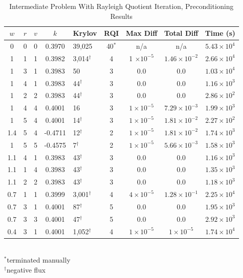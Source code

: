 \begin{table}[!h]
\caption{Intermediate Problem With Rayleigh Quotient Iteration, Preconditioning Results}
\begin{center}
\begin{tabular}{c c c c l c c c c}
\hline
$w$ & $r$ & $v$ & $k$ & Krylov & RQI & Max Diff & Total Diff & Time (s) \\[0.5ex]
\hline
0    & 0 & 0 & 0.3970 & 39,025              & 40$^{*}$  & n/a & n/a & $5.43 \times 10^{4}$ \\
1    & 1 & 1 & 0.3982 & 3,014$^{\dag}$ & 4 & 1 $\times 10^{-5}$ & $1.46 \times 10^{-2}$ & $2.66 \times 10^{4}$ \\
1    & 3 & 1 & 0.3983 & 50                     & 3 & 0.0 & 0.0 & $1.03 \times 10^{4}$ \\
1    & 4 & 1 & 0.3983 & 44$^{\dag}$      & 3 & 0.0 & 0.0 & $1.16 \times 10^{3}$ \\
1    & 2 & 2 & 0.3983 & 44$^{\dag}$      & 3 & 0.0 & 0.0 & $2.86 \times 10^{2}$ \\
1    & 4 & 4 & 0.4001 & 16                     & 3 & $1 \times 10^{-5}$ & $7.29 \times 10^{-3}$ & $1.99 \times 10^{3}$ \\
1    & 5 & 4 & 0.4001 & 14$^{\dag}$     & 3 & $1 \times 10^{-5}$ & $1.81 \times 10^{-2}$ & $2.27 \times 10^{2}$ \\
1.4 & 5 & 4 & -0.4711 & 12$^{\dag}$    & 2 & $1 \times 10^{-5}$ & $1.81 \times 10^{-2}$ & $1.74 \times 10^{3}$ \\
1    & 5 & 5 & -0.4575 & 7$^{\dag}$      & 2 & $1 \times 10^{-5}$ & $5.66 \times 10^{-3}$ & $1.58 \times 10^{3}$ \\
\hline
1.1 & 4 & 1 & 0.3983 & 43$^{\dag}$      & 3 & 0.0 & 0.0 & $1.16 \times 10^{3}$ \\
1.1 & 1 & 4 & 0.3983 & 43$^{\dag}$      & 3 & 0.0 & 0.0 & $1.35 \times 10^{3}$ \\
1.1 & 2 & 2 & 0.3983 & 43$^{\dag}$      & 3 & 0.0 & 0.0 & $1.18 \times 10^{3}$ \\
\hline
0.7 & 1 & 1 & 0.3999 & 3,001$^{\dag}$ & 4 & $4 \times 10^{-5}$ & $1.28 \times 10^{-1}$ & $2.25 \times 10^{4}$ \\
0.7 & 3 & 1 & 0.4001 & 87$^{\dag}$      & 5 & 0.0 & 0.0 & $1.95 \times 10^{3}$ \\
0.7 & 3 & 3 & 0.4001 & 47$^{\dag}$      & 5 & 0.0 & 0.0 & $2.92 \times 10^{3}$ \\
0.4 & 3 & 1 & 0.4001 & 1,052$^{\dag}$ & 4 & $1 \times 10^{-5}$ & $1 \times 10^{-5}$      & $1.74 \times 10^{4}$ \\
\hline 
\end{tabular}\\
$^{*}$terminated manually\\
$^{\dag}$negative flux
\end{center}
\label{table:impi RQI}
\end{table}
